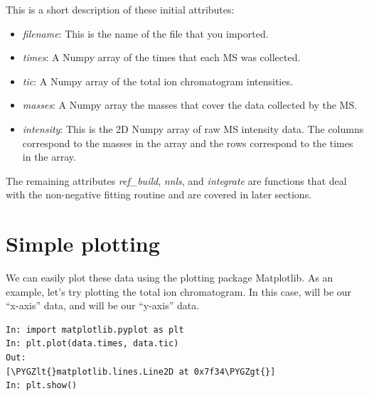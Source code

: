 \documentclass[letterpaper,10pt,english]{sphinxmanual}
\def\PYGZlt{\char`\<}
\def\PYGZgt{\char`\>}
\begin{document}
This is a short description of these initial attributes:
\begin{itemize}
\item {} 
\emph{filename}: This is the name of the file that you imported.

\item {} 
\emph{times}: A Numpy array of the times that each MS was collected.

\item {} 
\emph{tic}: A Numpy array of the total ion chromatogram intensities.

\item {} 
\emph{masses}: A Numpy array the masses that cover the data collected by the MS.

\item {} 
\emph{intensity}: This is the 2D Numpy array of raw MS intensity data. The
columns correspond to the masses in the  array and the rows
correspond to the times in the  array.

\end{itemize}

The remaining attributes \emph{ref\_build}, \emph{nnls}, and \emph{integrate} are functions
that deal with the non-negative fitting routine and are covered in later
sections.


\section{Simple plotting}
\label{basics:simple-plotting}
We can easily plot these data using the plotting package Matplotlib. As an
example, let's try plotting the total ion chromatogram. In this case,
 will be our ``x-axis'' data, and  will be our ``y-axis''
data.

\begin{Verbatim}[commandchars=\\\{\}]
In: import matplotlib.pyplot as plt
In: plt.plot(data.times, data.tic)
Out:
[\PYGZlt{}matplotlib.lines.Line2D at 0x7f34\PYGZgt{}]
In: plt.show()
\end{Verbatim}
\end{document}
